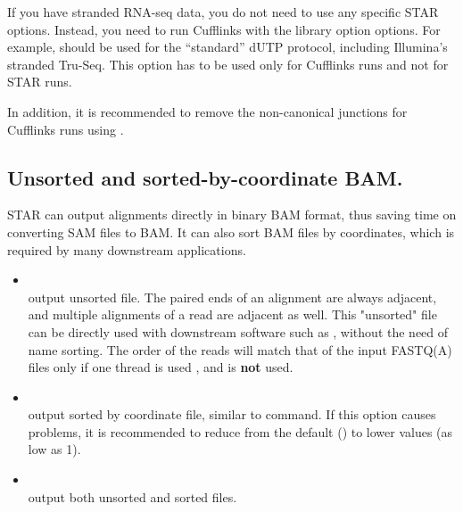 \documentclass[12pt]{article}
\begin{document}
If you have stranded RNA-seq data, you do not need to use any specific STAR options. Instead, you need to run Cufflinks with the library option  options. For example,  should be used for the “standard” dUTP protocol, including Illumina's stranded Tru-Seq. This option has to be used only for Cufflinks runs and not for STAR runs.

In addition, it is recommended to remove the non-canonical junctions for Cufflinks runs using  .

\subsection{Unsorted and sorted-by-coordinate BAM.}
STAR can output alignments directly in binary BAM format, thus saving time on converting SAM files to BAM. It can also sort BAM files by coordinates, which is required by many downstream applications.
\begin{itemize}
\raggedright
\item[]
 \\
output unsorted  file. The paired ends of an alignment are always adjacent, and multiple alignments of a read are adjacent as well. This "unsorted" file can be directly used with downstream software such as , without the need of name sorting. The order of the reads will match that of the input FASTQ(A) files only if one thread is used  , and   is \textbf{not} used.
\item[]
 \\
output sorted by coordinate  file, similar to  command. If this option causes problems, it is recommended to reduce  from the default () to lower values (as low as 1).
\item[]
 \\
output both unsorted and sorted files.
\end{itemize}
\end{document}
